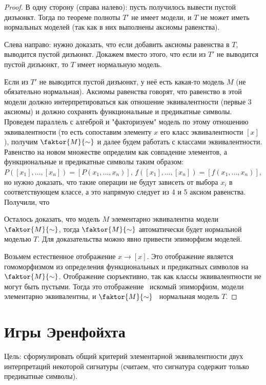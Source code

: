 \documentclass{article}
\begin{document}
\begin{proof}
	В одну сторону (справа налево): пусть получилось вывести пустой дизъюнкт. Тогда по теореме полноты $T'$ не имеет модели, и $T$ не может иметь нормальных моделей (так как в них выполнены аксиомы равенства).
	
	Слева направо: нужно доказать, что если добавить аксиомы равенства в $T$, выводится пустой дизъюнкт. Докажем вместо этого, что если из $T'$ не выводится пустой дизъюнкт, то $T$ имеет нормальную модель. 
	
	Если из $T'$ не выводится пустой дизъюнкт, у неё есть какая-то модель $M$ (не обязательно нормальная). Аксиомы равенства говорят, что равенство в этой модели должно интерпретироваться как отношение эквивалентности (первые 3 аксиомы) и должно сохранять функциональные и предикатные символы. Проведем параллель с алгеброй и "факторизуем" модель по этому отношению эквивалентности (то есть сопоставим элементу $x$ его класс эквивалентности $[x]$), получим $\faktor{M}{\sim}$ и далее будем работать с классами эквивалентности. Равенство на новом множестве определим как совпадение элементов, а функциональные и предикатные символы таким образом: $P([x_1], \dots, [x_n]) = \left[P(x_1, \dots, x_n)\right]$, $f([x_1], \dots, [x_n]) = \left[f(x_1, \dots, x_n)\right]$, но нужно доказать, что такие операции не будут зависеть от выбора $x_i$ в соответствующем классе, а это напрямую следует из 4 и 5 аксиом равенства. Получили, что 
	
	Осталось доказать, что модель $M$ элементарно эквивалентна модели $\faktor{M}{\sim}$, тогда $\faktor{M}{\sim}$ автоматически будет нормальной моделью $T$. Для доказательства можно явно привести эпиморфизм моделей. 
	
	Возьмем естественное отображение $x \rightarrow [x]$. Это отображение является гомоморфизмом из определения функциональных и предикатных символов на $\faktor{M}{\sim}$. Отображение сюръективно, так как классы эквивалентности не могут быть пустыми. Тогда это отображение \textemdash\ искомый эпиморфизм, модели элементарно эквивалентны, и $\faktor{M}{\sim}$ \textemdash\ нормальная модель $T$. 
\end{proof}

\setcounter{section}{25}
\section{Игры Эренфойхта}

Цель: сформулировать общий критерий
элементарной эквивалентности двух интерпретаций некоторой сигнатуры (считаем, что сигнатура содержит только предикатные символы).
\end{document}
